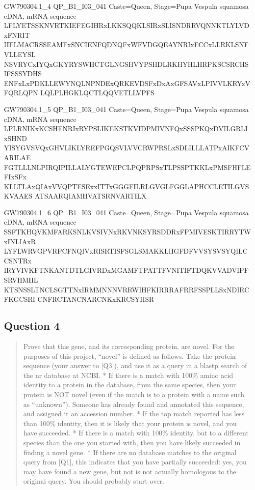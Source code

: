 \documentclass[]{article}
\begin{document}
GW790304.1\_4 QP\_B1\_I03\_041 Caste=Queen, Stage=Pupa Vespula squamosa
cDNA, mRNA sequence
LFLYETSSKNVRTKIEFEGIHRxLKKSQQKLSIRxSLISNDRRVQNNKTLYLVDxFNRIT
IIFLMACRSSEAMFxSNCIENFQDNQFxWFVDGQEAYNRIxFCCxLLRKLSNFVLLEYSL
NSVRYCxIYQxGKYRYSWHCTGLNGSHVYPSHDLRKHYHLHRPKSCSRCHSIFSSSYDHS
ENFxLxPDKLLEWYNQLNPNDExQRKEVDSFxDxAxGFSAVxLPIVVLKRYxVFQRLQPN
LQLPLHGKLQCTLQQVETLLVPFS

GW790304.1\_5 QP\_B1\_I03\_041 Caste=Queen, Stage=Pupa Vespula squamosa
cDNA, mRNA sequence
LPLRNIKxKCSHENRIxRYPSLIKEKSTKVIDPMIVNFQxSSSPKQxDVILGRLIxSHND
YISYGVSVQxGHVLIKLYREFPGQSVLVVCRWPRSLxSDLILLLATPxAIKFCVARILAE
FGTLLLNLPIRQIPILLALYGTEWEPCLPQPRPSxTLPSSPTKKLxPMSFHFLEFIxSFx
KLLTLAxQIAxVVQPTESExxITTxGGGFILRLGVGLFGGLAPHCCLETILGVSKVAAES
ATSAARQIAMHVATSRNVARTILX

GW790304.1\_6 QP\_B1\_I03\_041 Caste=Queen, Stage=Pupa Vespula squamosa
cDNA, mRNA sequence
SSFTKHQVKMFARKSNLKVSIVNxRKVNKSYRSDDRxFPMIVESKTIRRYTWxINLIAxR
LYFLWRVGPVRPCFNQIVxRISRTISFSGLSMAKKLIIGFDFVVSYSVSYQILCCSNTRx
IRYVIVKFTNKANTDTLGIVRDxMGAMFTPATTFVNITIFTDQKVVADVIPFSRVHMIIL
KTSNSSLTNCLSGTTNxIRMMNNNVRRWIHFKIRRRAFRRFSSPLLSxNDIRCFKGCSRI
CNFRCTANCNARCNKxKRCSYHSR

\subsection{Question 4}\label{question-4}

\begin{quote}
Prove that this gene, and its corresponding protein, are novel. For the
purposes of this project, ``novel'' is defined as follows. Take the
protein sequence (your answer to {[}Q3{]}), and use it as a query in a
blastp search of the nr database at NCBI. * If there is a match with
100\% amino acid identity to a protein in the database, from the same
species, then your protein is NOT novel (even if the match is to a
protein with a name such as ``unknown''). Someone has already found and
annotated this sequence, and assigned it an accession number. * If the
top match reported has less than 100\% identity, then it is likely that
your protein is novel, and you have succeeded. * If there is a match
with 100\% identity, but to a different species than the one you started
with, then you have likely succeeded in finding a novel gene. * If there
are no database matches to the original query from {[}Q1{]}, this
indicates that you have partially succeeded: yes, you may have found a
new gene, but not is not actually homologous to the original query. You
should probably start over.
\end{quote}
\end{document}
